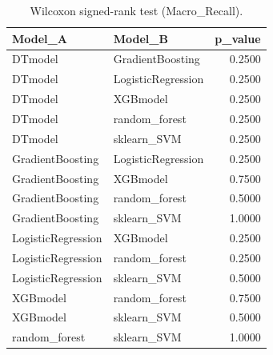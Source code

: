 \begin{table}[t]
\centering
\begin{tabular}{llr}
\toprule
Model_A & Model_B & p_value \\
\midrule
DTmodel & GradientBoosting & 0.2500 \\
DTmodel & LogisticRegression & 0.2500 \\
DTmodel & XGBmodel & 0.2500 \\
DTmodel & random_forest & 0.2500 \\
DTmodel & sklearn_SVM & 0.2500 \\
GradientBoosting & LogisticRegression & 0.2500 \\
GradientBoosting & XGBmodel & 0.7500 \\
GradientBoosting & random_forest & 0.5000 \\
GradientBoosting & sklearn_SVM & 1.0000 \\
LogisticRegression & XGBmodel & 0.2500 \\
LogisticRegression & random_forest & 0.2500 \\
LogisticRegression & sklearn_SVM & 0.5000 \\
XGBmodel & random_forest & 0.7500 \\
XGBmodel & sklearn_SVM & 0.5000 \\
random_forest & sklearn_SVM & 1.0000 \\
\bottomrule
\end{tabular}
\caption{Wilcoxon signed-rank test (Macro_Recall).}
\label{tab:wilcoxon_Macro_Recall}
\end{table}